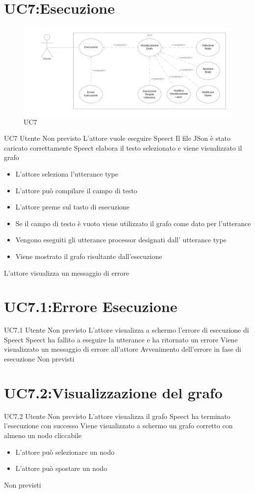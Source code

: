 \documentclass[../AnalisideiRequisiti.tex]{subfiles}
\begin{document}
\section{UC7:Esecuzione}
\begin{figure}[H]
	\caption{UC7}
	\centering
	\includegraphics[width=\textwidth]{../img/UC07.png}
\end{figure}
\UserCase
{UC7}
{Utente}
{Non previsto}
{L'attore vuole eseguire Speect}
{Il file JSon è stato caricato correttamente}
{Speect elabora il testo selezionato e viene visualizzato il grafo}
{\begin{itemize}
		\item{} L'attore seleziona l'utterance type
		\item{} L'attore può compilare il campo di testo
		\item{} L'attore preme sul tasto di esecuzione
		\item{} Se il campo di testo è vuoto viene utilizzato il grafo come dato per l'utterance
		\item{} Vengono eseguiti gli utterance processor designati dall' utterance type
		\item{} Viene mostrato il grafo risultante dall'esecuzione 
	\end{itemize}
}
{L'attore visualizza un messaggio di errore }

\section{UC7.1:Errore Esecuzione}
\UserCase
{UC7.1}
{Utente}
{Non previsto}
{L'attore visualizza a schermo l'errore di esecuzione di Speect }
{Speect ha fallito a eseguire la utterance e ha ritornato un errore}
{Viene visualizzato un messaggio di errore all'attore}
{Avvenimento dell'errore in fase di esecuzione}
{Non previsti}
\section{UC7.2:Visualizzazione del grafo}
\UserCase
{UC7.2}
{Utente}
{Non previsto}
{L'attore visualizza il grafo}
{Speect ha terminato l'esecuzione con successo}
{Viene visualizzato a schermo un grafo corretto con almeno un nodo cliccabile}
{
	\begin{itemize}
		\item{} L'attore può selezionare un nodo 
		\item{} L'attore può spostare un nodo 
	\end{itemize}
}
{Non previsti}
\end{document}
